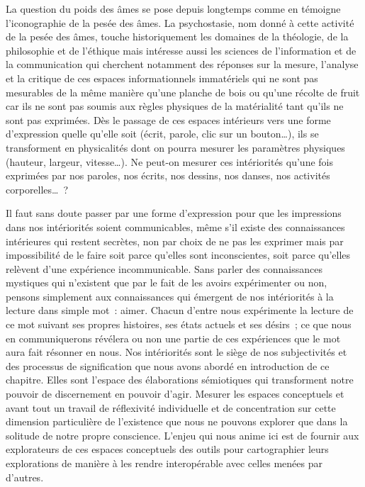 \documentclass[
  a4paper,
  DIV=11,
  numbers=noendperiod]{scrreprt}
\begin{document}
La question du poids des âmes se pose depuis longtemps comme en témoigne
l'iconographie de la pesée des âmes. La psychostasie, nom donné à cette
activité de la pesée des âmes, touche historiquement les domaines de la
théologie, de la philosophie et de l'éthique mais intéresse aussi les
sciences de l'information et de la communication qui cherchent notamment
des réponses sur la mesure, l'analyse et la critique de ces espaces
informationnels immatériels qui ne sont pas mesurables de la même
manière qu'une planche de bois ou qu'une récolte de fruit car ils ne
sont pas soumis aux règles physiques de la matérialité tant qu'ils ne
sont pas exprimées. Dès le passage de ces espaces intérieurs vers une
forme d'expression quelle qu'elle soit (écrit, parole, clic sur un
bouton\ldots), ils se transforment en physicalités dont on pourra
mesurer les paramètres physiques (hauteur, largeur, vitesse\ldots). Ne
peut-on mesurer ces intériorités qu'une fois exprimées par nos paroles,
nos écrits, nos dessins, nos danses, nos activités corporelles\ldots~?

Il faut sans doute passer par une forme d'expression pour que les
impressions dans nos intériorités soient communicables, même s'il existe
des connaissances intérieures qui restent secrètes, non par choix de ne
pas les exprimer mais par impossibilité de le faire soit parce qu'elles
sont inconscientes, soit parce qu'elles relèvent d'une expérience
incommunicable. Sans parler des connaissances mystiques qui n'existent
que par le fait de les avoirs expérimenter ou non, pensons simplement
aux connaissances qui émergent de nos intériorités à la lecture dans
simple mot~: aimer. Chacun d'entre nous expérimente la lecture de ce mot
suivant ses propres histoires, ses états actuels et ses désirs~; ce que
nous en communiquerons révélera ou non une partie de ces expériences que
le mot aura fait résonner en nous. Nos intériorités sont le siège de nos
subjectivités et des processus de signification que nous avons abordé en
introduction de ce chapitre. Elles sont l'espace des élaborations
sémiotiques qui transforment notre pouvoir de discernement en pouvoir
d'agir. Mesurer les espaces conceptuels et avant tout un travail de
réflexivité individuelle et de concentration sur cette dimension
particulière de l'existence que nous ne pouvons explorer que dans la
solitude de notre propre conscience. L'enjeu qui nous anime ici est de
fournir aux explorateurs de ces espaces conceptuels des outils pour
cartographier leurs explorations de manière à les rendre interopérable
avec celles menées par d'autres.
\end{document}
